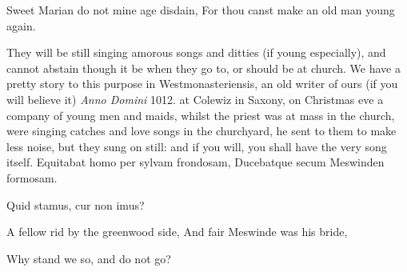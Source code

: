 {Sweet Marian do not mine age disdain,
For thou canst make an old man young again.

They will be still singing amorous songs and ditties (if young
especially), and cannot abstain though it be when they go to, or should
be at church. We have a pretty story to this purpose in
Westmonasteriensis, an old writer of ours (if you will believe
it) \emph{Anno Domini} 1012. at Colewiz in Saxony, on Christmas eve a company
of young men and maids, whilst the priest was at mass in the church,
were singing catches and love songs in the churchyard, he sent to them
to make less noise, but they sung on still: and if you will, you shall
have the very song itself.
Equitabat homo per sylvam frondosam,
Ducebatque secum Meswinden formosam.

Quid stamus, cur non imus?


A fellow rid by the greenwood side,
And fair Meswinde was his bride,

Why stand we so, and do not go?

}
